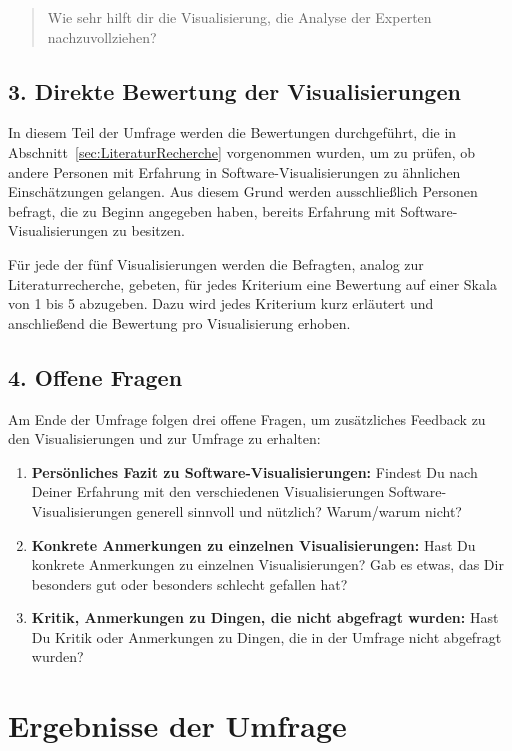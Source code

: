 \begin{quote}
    Wie sehr hilft dir die Visualisierung, die Analyse der Experten nachzuvollziehen?
\end{quote}

\subsection*{3. Direkte Bewertung der Visualisierungen} \label{sec:DirekteBewertung}
In diesem Teil der Umfrage werden die Bewertungen durchgeführt, die in Abschnitt~\ref{sec:LiteraturRecherche} vorgenommen wurden, um zu prüfen, ob andere Personen mit Erfahrung in Software-Visualisierungen zu ähnlichen Einschätzungen gelangen. Aus diesem Grund werden ausschließlich Personen befragt, die zu Beginn angegeben haben, bereits Erfahrung mit Software-Visualisierungen zu besitzen.

Für jede der fünf Visualisierungen werden die Befragten, analog zur Literaturrecherche, gebeten, für jedes Kriterium eine Bewertung auf einer Skala von 1 bis 5 abzugeben. Dazu wird jedes Kriterium kurz erläutert und anschließend die Bewertung pro Visualisierung erhoben.

\subsection*{4. Offene Fragen} \label{sec:OffeneFragen}
Am Ende der Umfrage folgen drei offene Fragen, um zusätzliches Feedback zu den Visualisierungen und zur Umfrage zu erhalten:
\begin{enumerate}
    \item \textbf{Persönliches Fazit zu Software-Visualisierungen:} Findest Du nach Deiner Erfahrung mit den verschiedenen Visualisierungen Software-Visualisierungen generell sinnvoll und nützlich? Warum/warum nicht?
    \item \textbf{Konkrete Anmerkungen zu einzelnen Visualisierungen:} Hast Du konkrete Anmerkungen zu einzelnen Visualisierungen? Gab es etwas, das Dir besonders gut oder besonders schlecht gefallen hat?
    \item \textbf{Kritik, Anmerkungen zu Dingen, die nicht abgefragt wurden:} Hast Du Kritik oder Anmerkungen zu Dingen, die in der Umfrage nicht abgefragt wurden?
\end{enumerate}

\section{Ergebnisse der Umfrage} \label{sec:ErgebnisseUmfrage}

